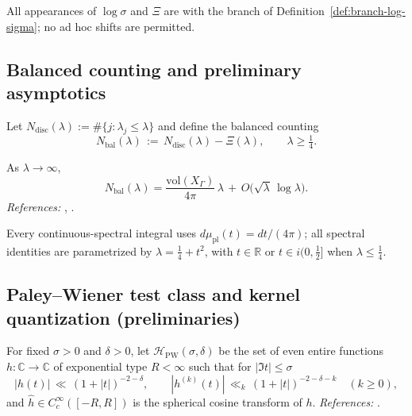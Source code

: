 \begin{invariant}
\label{inv:C1}
All appearances of $\log \sigma$ and $\Xi$ are with the branch of Definition~\ref{def:branch-log-sigma}; no ad hoc shifts are permitted. \relax
\end{invariant}

\subsection{Balanced counting and preliminary asymptotics} %
\label{subsec:ch4-part1-balanced} \relax

\begin{definition}
\label{def:balanced-counting}
Let $N_{\mathrm{disc}}(\lambda):=\#\{j:\lambda_j\le \lambda\}$ and define the balanced counting
\[
  N_{\mathrm{bal}}(\lambda) \,:=\, N_{\mathrm{disc}}(\lambda) - \Xi(\lambda),\qquad \lambda\ge \tfrac14.
\]
\end{definition}

\begin{theorem}
\label{thm:balanced-selberg}
As $\lambda\to\infty$,
\[
  N_{\mathrm{bal}}(\lambda) = \frac{\mathrm{vol}(X_\Gamma)}{4\pi}\,\lambda \,+\, O\!\big(\sqrt{\lambda}\,\log \lambda\big).
\]
\emph{References:} \cite[Ch.~11–12]{Hejhal1983vol2}, \cite{Selberg1956}. \relax
\end{theorem}

\begin{invariant}
\label{inv:C2C3}
Every continuous-spectral integral uses $d\mu_{\mathrm{pl}}(t)=dt/(4\pi)$; all spectral identities are parametrized by $\lambda=\frac14+t^2$, with $t\in\mathbb{R}$ or $t\in i(0,\tfrac12]$ when $\lambda\le \frac14$. \relax
\end{invariant}

\subsection{Paley–Wiener test class and kernel quantization (preliminaries)} %
\label{subsec:ch4-part1-PW-kernel} \relax

\begin{definition}
\label{def:PW-class}
For fixed $\sigma>0$ and $\delta>0$, let $\mathcal{H}_{\mathrm{PW}}(\sigma,\delta)$ be the set of even entire functions $h:\mathbb{C}\to \mathbb{C}$ of exponential type $R<\infty$ such that for $|\Im t|\le \sigma$
\[
  |h(t)| \,\ll\, (1+|t|)^{-2-\delta},\qquad
  |h^{(k)}(t)| \,\ll_k\, (1+|t|)^{-2-\delta-k}\quad (k\ge 0),
\]
and $\widehat{h}\in C_c^\infty([-R,R])$ is the spherical cosine transform of $h$. \emph{References:} \cite[Ch.~3]{Hejhal1983vol2}. \relax
\end{definition}

